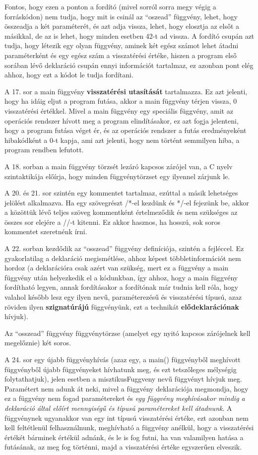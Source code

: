 Fontos, hogy ezen a ponton a fordító (mivel sorról sorra megy végig a forráskódon) nem tudja, hogy mit is csinál az ``oszead'' függvény, lehet, hogy összeadja a két paraméterét, és azt adja vissza, lehet, hogy elosztja az elsőt a másikkal, de az is lehet, hogy minden esetben 42-t ad vissza. A fordító csupán azt tudja, hogy létezik egy olyan függvény, aminek két egész számot lehet átadni paraméterként és egy egész szám a visszatérési értéke, hiszen a program első sorában lévő deklaráció csupán ennyi információt tartalmaz, ez azonban pont elég ahhoz, hogy ezt a kódot le tudja fordítani.

A 17. sor a main függvény \textbf{visszatérési utasítását} tartalmazza. Ez azt jelenti, hogy ha idáig eljut a program futása, akkor a main függvény térjen vissza, 0 visszatérési értékkel. Mivel a main függvény egy speciális függvény, amit az operációs rendszer hívott meg a program elindításakor, ez azt fogja jelenteni, hogy a program futása véget ér, és az operációs rendszer a futás eredményeként hibakódként a 0-t kapja, ami azt jelenti, hogy nem történt semmilyen hiba, a program rendben lefutott.

A 18. sorban a main függvény törzsét lezáró kapcsos zárójel van, a C nyelv szintaktikája előírja, hogy minden függvénytörzset egy ilyennel zárjunk le. 

A 20. és 21. sor szintén egy kommentet tartalmaz, ezúttal a másik lehetséges jelölést alkalmazva. Ha egy szövegrészt /*-el kezdünk és */-el fejezünk be, akkor a közöttük lévő teljes szöveg kommentként értelmeződik és nem szükséges az összes sor elejére a //-t kitenni. Ez akkor hasznos, ha hosszú, sok soros kommentet szeretnénk írni. 

A 22. sorban kezdődik az ``osszead'' függvény definíciója, szintén a fejléccel. Ez gyakorlatilag a deklaráció megismétlése, ahhoz képest többletinformációt nem hordoz (a deklarációra csak azért van szükség, mert ez a függvény a main függvény után helyezkedik el a kódunkban, így ahhoz, hogy a main függvény fordítható legyen, annak fordításakor a fordítónak már tudnia kell róla, hogy valahol később lesz egy ilyen nevű, paraméterezésű és visszatérési típusú, azaz röviden ilyen \textbf{szignatúrájú} függvényünk, ezt a technikát \textbf{elődeklarációnak} hívjuk).

Az ``osszead'' függvény függvénytörzse (amelyet egy nyitó kapcsos zárójelnek kell megelőznie) két soros. 

A 24. sor egy újabb függvényhívás (azaz egy, a main() függvényből meghívott függvényből újabb függvényeket hívhatunk meg, és ezt tetszőleges mélységig folytathatjuk), jelen esetben a misztikusFuggveny nevű függvényt hívjuk meg. Paramétert nem adunk át neki, mivel a függvény deklarációja megmondja, hogy ez a függvény nem fogad paramétereket és \emph{egy függvény meghívásakor mindig a deklaráció által előírt mennyiségű és típusú paramétereket kell átadnunk}. A függvénynek ugyanakkor van egy int típusú visszatérési értéke, ezt azonban nem kell feltétlenül felhasználnunk, meghívható a függvény anélkül, hogy a visszatérési értékét bárminek értékül adnánk, és le is fog futni, ha van valamilyen hatása a futásának, az meg fog történni, majd a visszatérési értéke egyszerűen elveszik.


